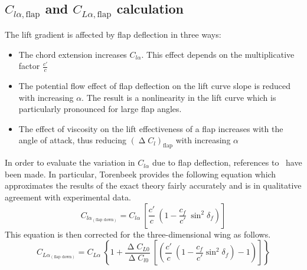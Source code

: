 \subsection{$C_{l\alpha, \text{flap}}$ and  $C_{L\alpha, \text{flap}}$ calculation}
The lift gradient is affected by flap deflection in three ways:
%
\begin{itemize}
\item The chord extension increases $C_{l\alpha}$. This effect depends on the multiplicative factor $\frac{c'}{c}$
\item The potential flow effect of flap deflection on the lift curve slope is reduced with increasing $\alpha$. The result is a nonlinearity in the lift curve which is particularly pronounced for large flap angles.
\item The effect of viscosity on the lift effectiveness of a flap increases with the angle of attack, thus reducing $\left(\upDelta C_{l}\right)_{\text{flap}}$ with increasing $\alpha$
\end{itemize}
%
\noindent
In order to evaluate the variation in $C_{l\alpha}$ due to flap deflection, references to~\cite{torenbeek1982synthesis} have been made. In particular, Torenbeek provides the following equation which approximates the results of the exact theory fairly accurately and is in qualitative agreement with experimental data. 
%
\begin{equation}
C_{l\alpha_{\left(\text{flap down}\right)}}=C_{l\alpha}\ \left[\dfrac{c'}{c}\ \left(1-\dfrac{c_f}{c'}\ \sin^2\delta_f\right)\right]
\label{eqn:ClalphaFlap}
\end{equation}
%
\noindent
This equation is then corrected for the three-dimensional wing as follows.
%
\begin{equation}
C_{L\alpha_{\left(\text{flap down}\right)}}=C_{L\alpha}\ \left\{1+\dfrac{\upDelta C_{L0}}{\upDelta C_{l0}}\ \left[\left(\dfrac{c'}{c}\ \left(1-\dfrac{c_f}{c'}\sin^2\delta_f\right)-1\right)\right]\right\}
\label{eqn:ClalphaFlap}
\end{equation}
%
